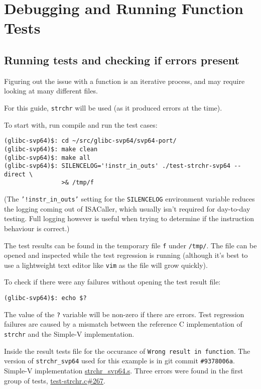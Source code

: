 \section{Debugging and Running Function Tests}

\subsection{Running tests and checking if errors present}

Figuring out the issue with a function is an iterative process, and may require
looking at many different files.

For this guide, \texttt{strchr} will be used (as it produced errors at the time).

To start with, run compile and run the test cases:

\begin{verbatim}
(glibc-svp64)$: cd ~/src/glibc-svp64/svp64-port/
(glibc-svp64)$: make clean
(glibc-svp64)$: make all
(glibc-svp64)$: SILENCELOG='!instr_in_outs' ./test-strchr-svp64 --direct \
                >& /tmp/f
\end{verbatim}

(The \texttt{'!instr\_in\_outs'} setting for the \texttt{SILENCELOG}
environment variable reduces the logging coming out of ISACaller,
which usually isn't required for day-to-day testing. Full logging
however is useful when trying to determine if the instruction
behaviour is correct.)

The test results can be found in the temporary file \texttt{f} under
\texttt{/tmp/}. The file can be opened and inspected while the test regression
is running (although it's best to use a lightweight text editor like
\texttt{vim} as the file will grow quickly).

To check if there were any failures without opening the test result file:

\begin{verbatim}
(glibc-svp64)$: echo $?
\end{verbatim}

The value of the \texttt{?} variable will be non-zero if there are errors. Test
regression failures are caused by a mismatch between the reference C
implementation of \texttt{strchr} and the Simple-V implementation.

Inside the result tests file for the occurance of
\texttt{Wrong result in function}.
The version of \texttt{strchr\_svp64} used for this example is in git commit
\texttt{\#9378006a}. Simple-V implementation
\href{https://git.vantosh.com/ngisearch/glibc-svp64/src/commit/9378006a84bdef6af85eb0f810fb62fedc62c588/svp64-port/svp64/strchr_svp64.s}{strchr\_svp64.s}.
Three errors were found in the first group of tests,
\href{https://git.vantosh.com/ngisearch/glibc-svp64/src/commit/9378006a84bdef6af85eb0f810fb62fedc62c588/svp64-port/test-strchr.c#L267}{test-strchr.c\#267}.

